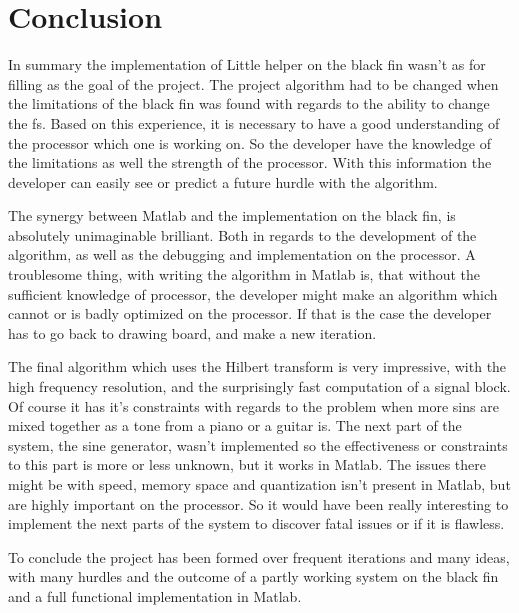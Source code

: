 
\chapter{Conclusion}
In summary the implementation of Little helper on the black fin wasn't as for filling as the goal of the project.
The project algorithm had to be changed when the limitations of the black fin was found with regards to the ability to change the fs.
Based on this experience, it is necessary to have a good understanding of the processor which one is working on. 
So the developer have the knowledge of the limitations as well the strength of the processor. 
With this information the developer can easily see or predict a future hurdle with the algorithm.

The synergy between Matlab and the implementation on the black fin, is absolutely unimaginable brilliant.
Both in regards to the development of the algorithm, as well as the debugging and implementation on the processor. 
A troublesome thing, with writing the algorithm in Matlab is, that without the sufficient knowledge of processor, the developer might make an algorithm which cannot or is badly optimized on the processor.
If that is the case the developer has to go back to drawing board, and make a new iteration.

The final algorithm which uses the Hilbert transform is very impressive, with the high frequency resolution, and the surprisingly fast computation of a signal block.
Of course it has it's constraints with regards to the problem when more sins are mixed together as a tone from a piano or a guitar is.
The next part of the system, the sine generator, wasn't implemented so the effectiveness or constraints to this part is more or less unknown, but it works in Matlab.
The issues there might be with speed, memory space and quantization isn't present in Matlab, but are highly important on the processor.
So it would have been really interesting to implement the next parts of the system to discover fatal issues or if it is flawless.

To conclude the project has been formed over frequent iterations and many ideas, with many hurdles and the outcome of a partly working system on the black fin and a full functional implementation in Matlab.
  
\FloatBarrier